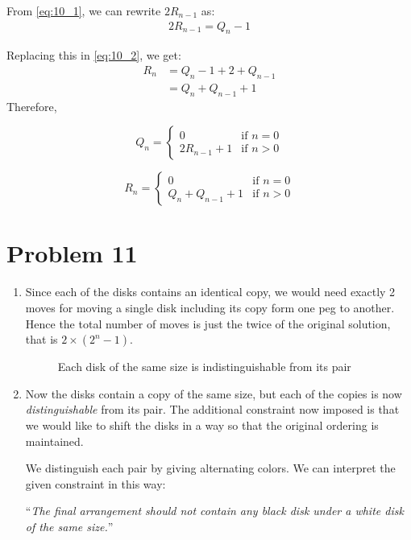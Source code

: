 From \eqref{eq:10_1}, we can rewrite $2R_{n-1}$ as:
\begin{align}
    2R_{n-1} = Q_n - 1
\end{align}

Replacing this in \eqref{eq:10_2}, we get:
\begin{align}
    R_n & = Q_n - 1 + 2 + Q_{n-1} \nonumber \\
        & = Q_n + Q_{n-1} + 1
\end{align}
Therefore,

\begin{minipage}{.5\textwidth}
    \begin{equation*}
        Q_n =
        \begin{cases}
            0            & \text{if } n=0   \\
            2R_{n-1} + 1 & \text{if } n > 0
        \end{cases}
    \end{equation*}
\end{minipage}%
\begin{minipage}{0.5\textwidth}
    \begin{equation*}
        R_n =
        \begin{cases}
            0                 & \text{if } n=0   \\
            Q_n + Q_{n-1} + 1 & \text{if } n > 0
        \end{cases}
    \end{equation*}
\end{minipage}
\section*{Problem 11}
\begin{enumerate}
    \item Since each of the disks contains an identical copy, we would need exactly 2 moves for moving a single disk including its copy form one peg to another. Hence the total number of moves is just the twice of the original solution, that is $2 \times (2^n-1)$.
          \begin{figure}[h!]
              \centering
              \caption*{Each disk of the same size is indistinguishable from its pair}
              \label{fig:fig11_1}
          \end{figure}
    \item Now the disks contain a copy of the same size, but each of the copies is now \textit{distinguishable} from its pair. The additional constraint now imposed is that we would like to shift the disks in a way so that the original ordering is maintained.
          \begin{figure}[h!]
              \centering
              \label{fig:fig11_2}
          \end{figure}

          We distinguish each pair by giving alternating colors. We can interpret the given constraint in this way:

          ``\textit{The final arrangement should not contain any black disk under a white disk of the same size.}''
\end{enumerate}

